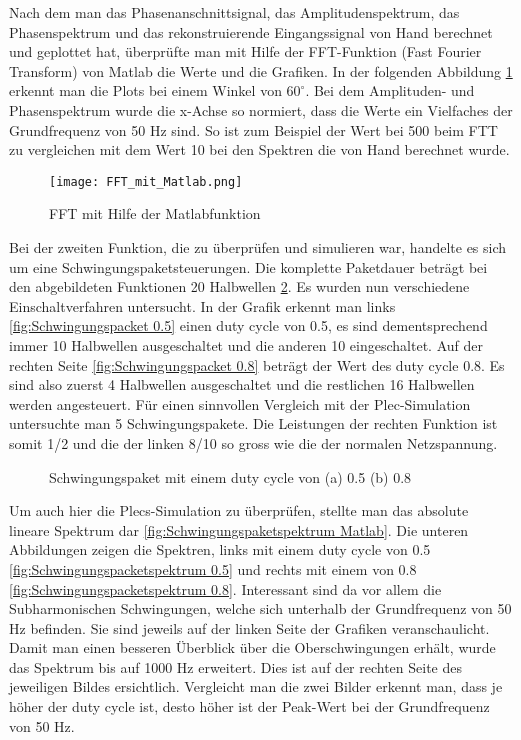 Nach dem man das Phasenanschnittsignal, das Amplitudenspektrum,  das Phasenspektrum und das rekonstruierende Eingangssignal von Hand berechnet und geplottet hat, überprüfte man mit Hilfe der FFT-Funktion (Fast Fourier Transform) von Matlab die Werte und die Grafiken. In der folgenden Abbildung \ref{fig:FFT mit Matlab} erkennt man die Plots bei einem Winkel von $60^\circ$. Bei dem Amplituden- und Phasenspektrum wurde die x-Achse so normiert, dass die Werte ein Vielfaches der Grundfrequenz von 50 Hz sind. So ist zum Beispiel der Wert bei 500 beim FTT zu vergleichen mit dem Wert 10 bei den Spektren die von Hand berechnet wurde.

\begin{figure}[ht!]
	\centering
	\texttt{[image: FFT\_mit\_Matlab.png]}	
	\caption{FFT mit Hilfe der Matlabfunktion}
	\label{fig:FFT mit Matlab}
\end{figure}

Bei der zweiten Funktion, die zu überprüfen und simulieren war, handelte es sich um eine Schwingungspaketsteuerungen. Die komplette Paketdauer beträgt bei den abgebildeten Funktionen 20 Halbwellen \ref{fig:Schwingungspaket Matlab}. Es wurden nun verschiedene Einschaltverfahren untersucht. In der Grafik  erkennt man links \ref{fig:Schwingungspacket 0.5} einen duty cycle von 0.5, es sind dementsprechend immer 10 Halbwellen  ausgeschaltet und die anderen 10 eingeschaltet. Auf der rechten Seite \ref{fig:Schwingungspacket 0.8} beträgt der Wert des duty cycle 0.8. Es sind also zuerst 4 Halbwellen ausgeschaltet und die restlichen 16 Halbwellen werden angesteuert. Für einen sinnvollen Vergleich mit der Plec-Simulation untersuchte man 5 Schwingungspakete. Die Leistungen der rechten Funktion ist somit 1/2 und die der linken 8/10 so gross wie die der normalen Netzspannung.

\begin{figure}[h]
	\centering
	\qquad
	\caption{Schwingungspaket mit einem duty cycle von (a) 0.5 (b) 0.8}
	\label{fig:Schwingungspaket Matlab}
\end{figure} 

Um auch hier die Plecs-Simulation zu überprüfen, stellte man das absolute lineare Spektrum dar \ref{fig:Schwingungspaketspektrum Matlab}. Die unteren  Abbildungen zeigen die Spektren, links mit einem duty cycle von 0.5 \ref{fig:Schwingungspacketspektrum 0.5} und rechts mit einem von 0.8 \ref{fig:Schwingungspacketspektrum 0.8}. Interessant sind da vor allem die Subharmonischen Schwingungen, welche sich unterhalb der Grundfrequenz von 50 Hz befinden. Sie sind jeweils auf der linken Seite der Grafiken veranschaulicht. Damit man einen besseren Überblick über die Oberschwingungen erhält, wurde das Spektrum bis auf 1000 Hz erweitert. Dies ist auf der rechten Seite des jeweiligen Bildes ersichtlich. Vergleicht man die zwei Bilder erkennt man, dass je höher der duty cycle ist, desto höher ist der Peak-Wert bei der Grundfrequenz von 50 Hz. 

